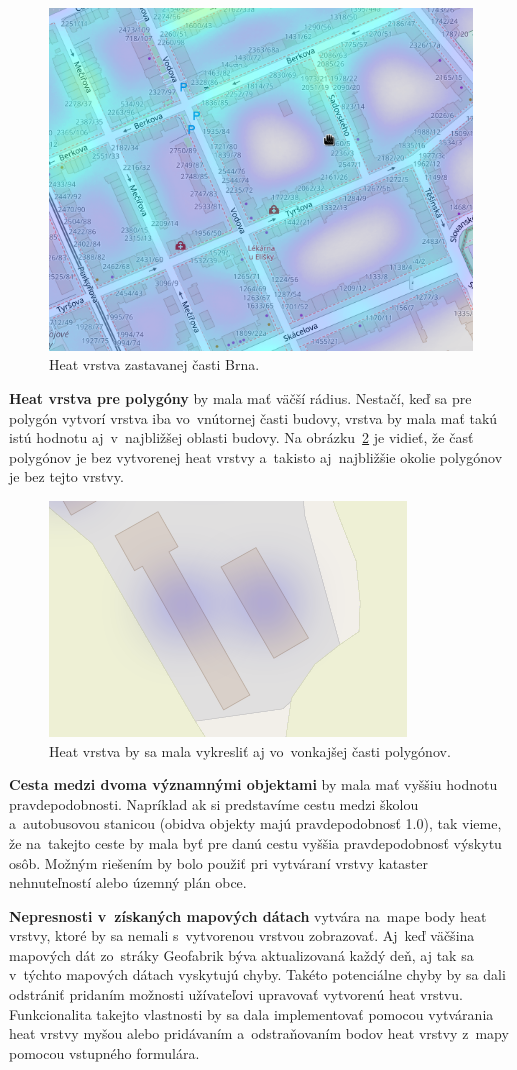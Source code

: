 \begin{figure}[ht]
    \centering
    \includegraphics[width=0.6\linewidth]{obrazky-figures/brno-zastavana-oblast.png}
    \caption{Heat vrstva zastavanej časti Brna.}
    \label{fig:brno-zastavana-oblast}
\end{figure}

\textbf{Heat vrstva pre polygóny} by mala mať väčší rádius. Nestačí, keď sa pre polygón vytvorí vrstva iba vo~vnútornej časti budovy, vrstva by mala mať takú istú hodnotu aj~v~najbližšej oblasti budovy. Na obrázku~\ref{fig:nechov-bad-heatmap} je vidieť, že časť polygónov je bez vytvorenej heat vrstvy a~takisto aj~najbližšie okolie polygónov je bez tejto vrstvy.

\begin{figure}[ht]
    \centering
    \includegraphics[width=0.3\linewidth]{obrazky-figures/nechov-zle-vykreslenie.png}
    \caption{Heat vrstva by sa mala vykresliť aj vo~vonkajšej časti polygónov.}
    \label{fig:nechov-bad-heatmap}
\end{figure}

\textbf{Cesta medzi dvoma významnými objektami} by mala mať vyššiu hodnotu pravdepodobnosti. Napríklad ak si predstavíme cestu medzi školou a~autobusovou stanicou (obidva objekty majú pravdepodobnosť 1.0), tak vieme, že na~takejto ceste by mala byť pre danú cestu vyššia pravdepodobnosť výskytu osôb. Možným riešením by bolo použiť pri vytváraní vrstvy kataster nehnuteľností alebo územný plán obce.

\textbf{Nepresnosti v~získaných mapových dátach} vytvára na~mape body heat vrstvy, ktoré by sa nemali s~vytvorenou vrstvou zobrazovať. Aj~keď väčšina mapových dát zo~stráky Geofabrik býva aktualizovaná  
každý deň, aj tak sa v~týchto mapových dátach vyskytujú chyby. Takéto potenciálne chyby by sa dali odstrániť pridaním možnosti užívateľovi upravovať vytvorenú heat vrstvu. Funkcionalita takejto vlastnosti by sa dala implementovať pomocou vytvárania heat vrstvy myšou alebo pridávaním a~odstraňovaním bodov heat vrstvy z~mapy pomocou vstupného formulára.




